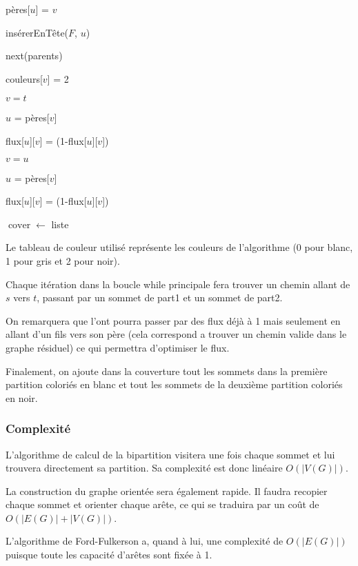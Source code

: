 \documentclass[a4paper,10pt]{article}
\DeclareMathOperator{\cover}{cover}
\begin{document}
\begin{algorithm}[H]
{{{{				pères[$u$] = $v$
				
				insérerEnTête($F$, $u$)
			}
			next(parents)
		}
		
		couleurs[$v$] = 2
	}
	
	$v = t$
	
	$u$ = pères[$v$]
	{	
		flux[$u$][$v$] = (1-flux[$u$][$v$])
		
		$v = u$
		
		$u$ = pères[$v$]
	}
	flux[$u$][$v$] = (1-flux[$u$][$v$])
}

$\cover  \leftarrow$ liste


\Retour{$\cover$}

\end{algorithm}


Le tableau de couleur utilisé représente les couleurs de l'algorithme (0 pour blanc, 1 pour gris et 2 pour noir).

Chaque itération dans la boucle while principale fera trouver un chemin allant de $s$ vers $t$, passant par un sommet de part1 et un sommet de part2.

On remarquera que l'ont pourra passer par des flux déjà à 1 mais seulement en allant d'un fils vers son père (cela correspond a trouver un chemin valide dans le graphe résiduel) ce qui permettra d'optimiser le flux.

Finalement, on ajoute dans la couverture tout les sommets dans la première partition coloriés en blanc et tout les sommets de la deuxième partition coloriés en noir.

\subsubsection{Complexité}

L'algorithme de calcul de la bipartition visitera une fois chaque sommet et lui trouvera directement sa partition. Sa complexité est donc linéaire $O(|V(G)|)$.

La construction du graphe orientée sera également rapide. Il faudra recopier chaque sommet et orienter chaque arête, ce qui se traduira par un coût de $O(|E(G)|+ |V(G)|)$.

L'algorithme de Ford-Fulkerson a, quand à lui, une complexité de $O(|E(G)|)$ puisque toute les capacité d'arêtes sont fixée à 1.
\end{document}

